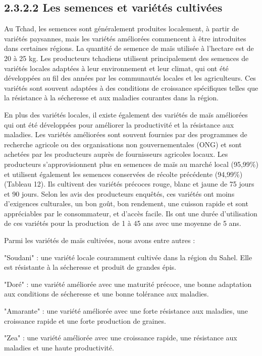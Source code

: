 \documentclass[12pt,oneside]{report}
\begin{document}
\subsection{2.3.2.2 Les semences et variétés cultivées}
Au Tchad, les semences sont généralement produites localement, à partir de variétés paysannes, mais les variétés améliorées commencent à être introduites dans certaines régions. La quantité de semence de maïs utilisée à l’hectare est de 20 à 25 kg. Les producteurs tchadiens utilisent principalement des semences de variétés locales adaptées à leur environnement et leur climat, qui ont été développées au fil des années par les communautés locales et les agriculteurs. Ces variétés sont souvent adaptées à des conditions de croissance spécifiques telles que la résistance à la sécheresse et aux maladies courantes dans la région.

En plus des variétés locales, il existe également des variétés de maïs améliorées qui ont été développées pour améliorer la productivité et la résistance aux maladies. Les variétés améliorées sont souvent fournies par des programmes de recherche agricole ou des organisations non gouvernementales (ONG) et sont achetées par les producteurs auprès de fournisseurs agricoles locaux. Les producteurs s’approvisionnent plus en semences de maïs au marché local (95,99\%) et utilisent également les semences conservées de récolte précédente (94,99\%) (Tableau 12). Ils cultivent des variétés précoces rouge, blanc et jaune de 75 jours et 90 jours. Selon les avis des producteurs enquêtés, ces variétés ont moins d'exigences culturales, un bon goût, bon rendement, une cuisson rapide et sont appréciables par le consommateur, et d’accès facile. Ils ont une durée d’utilisation de ces variétés pour la production de 1 à 45 ans avec une moyenne de 5 ans.

Parmi les variétés de maïs cultivées, nous avons entre autres :

"Soudani" : une variété locale couramment cultivée dans la région du Sahel. Elle est résistante à la sécheresse et produit de grandes épis.

"Doré" : une variété améliorée avec une maturité précoce, une bonne adaptation aux conditions de sécheresse et une bonne tolérance aux maladies.

"Amarante" : une variété améliorée avec une forte résistance aux maladies, une croissance rapide et une forte production de graines.

"Zea" : une variété améliorée avec une croissance rapide, une résistance aux maladies et une haute productivité.
\end{document}
